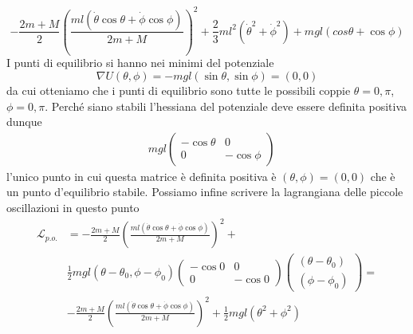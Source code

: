 \documentclass[
10pt, %
a4paper, %
oneside, %
headinclude,footinclude, %
BCOR5mm, %
]{scrartcl}
\begin{document}
\begin{esercizio}
	\[-\frac{2m+M}{2}\left(\frac{ml(\dot{\theta}\cos\theta+\dot{\phi}\cos\phi)}{2m + M}\right)^2+ \frac{2}{3}ml^2(\dot{\theta}^2+\dot{\phi}^2) + mgl(cos\theta+\cos\phi)\]
	I punti di equilibrio si hanno nei minimi del potenziale
	\[\nabla U(\theta, \phi) = -mgl(\sin\theta, \sin\phi) = (0, 0)\]
	da cui otteniamo che i punti di equilibrio sono tutte le possibili coppie \(\theta = 0, \pi\), \(\phi = 0, \pi\). Perché siano stabili l'hessiana del potenziale deve essere definita positiva dunque
	\begin{align*}
		&mgl
		\begin{pmatrix}
			-\cos\theta&0\\
			0&-\cos\phi
		\end{pmatrix}
	\end{align*}
l'unico punto in cui questa matrice è definita positiva è \((\theta,\phi) = (0, 0)\) che è un punto d'equilibrio stabile. Possiamo infine scrivere la lagrangiana delle piccole oscillazioni in questo punto 
\begin{align*}
	\mathcal{L}_{p.o.} &=-\frac{2m+M}{2}\left(\frac{ml(\dot{\theta}\cos\theta+\dot{\phi}\cos\phi)}{2m + M}\right)^2+\\
	&\frac{1}{2}mgl
	 (\theta-\theta_0, \phi-\phi_0)
	\begin{pmatrix}
		-\cos0&0\\
		0&-\cos0
	\end{pmatrix}
	\begin{pmatrix}
		(\theta-\theta_0)\\ (\phi-\phi_0)
		\end{pmatrix} = \\
&-\frac{2m+M}{2}\left(\frac{ml(\dot{\theta}\cos\theta+\dot{\phi}\cos\phi)}{2m + M}\right)^2+\frac{1}{2}mgl(\theta^2+\phi^2)
\end{align*}
\end{esercizio}
\end{document}
